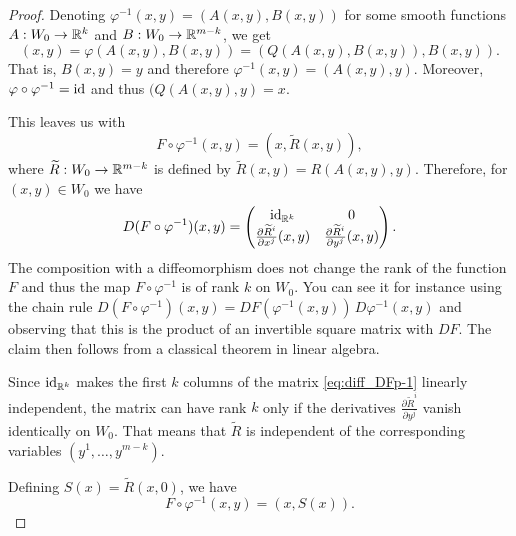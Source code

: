 \begin{proof}
  Denoting $\varphi^{-1}(x,y) = (A(x,y), B(x,y))$ for some smooth functions
  $A : W_0 \to \mathbb{R}^k$ and $B : W_0 \to \mathbb{R}^{m-k}$, we get
  \begin{equation}
    (x,y) = \varphi(A(x,y), B(x,y)) = (Q(A(x,y), B(x,y)), B(x,y)).
  \end{equation}
  That is, $B(x,y) = y$ and therefore $\varphi^{-1}(x,y) = (A(x,y), y)$.
  Moreover, $\varphi \circ \varphi^{-1} = \operatorname{id}$ and thus $(Q(A(x,y),y) = x$.

  This leaves us with
  \begin{equation}
    F\circ\varphi^{-1}(x,y) = (x, \widetilde{R}(x,y)),
  \end{equation}
  where $\widetilde{R} : W_0 \to\mathbb{R}^{m-k}$ is defined by $\widetilde{R}(x,y) = R(A(x,y), y)$.
  Therefore, for $(x,y)\in W_0$ we have
  \begin{equation}\label{eq:diff_DFp-1}
    D(F\circ\varphi^{-1})(x,y) = \begin{pmatrix}
      \operatorname{id}_{\mathbb{R}^k} & 0 \\
      \frac{\partial\widetilde{R}^i}{\partial x^j}(x,y) & \frac{\partial\widetilde{R}^i}{\partial y^j}(x,y)
    \end{pmatrix}.
  \end{equation}
  The composition with a diffeomorphism does not change the rank of the function $F$ and
  thus the map $F\circ\varphi^{-1}$ is of rank $k$ on $W_0$.
  You can see it for instance using the chain rule
  $D(F\circ\varphi^{-1})(x,y) = DF(\varphi^{-1}(x,y))\, D\varphi^{-1}(x,y)$ and
  observing that this is the product of an invertible square matrix with $DF$.
  The claim then follows from a classical theorem in linear algebra.

  Since $\operatorname{id}_{\mathbb{R}^k}$ makes the first $k$ columns of the matrix \eqref{eq:diff_DFp-1}
  linearly independent, the matrix can have rank $k$ only if the derivatives 
  $\frac{\partial \widetilde{R}^i}{\partial y^j}$ vanish identically on $W_0$.
  That means that $\widetilde{R}$ is independent of the corresponding variables
  $(y^1, \ldots, y^{m-k})$.
  
  Defining $S(x) = \widetilde{R}(x, 0)$, we have
  \begin{equation}
    F\circ\varphi^{-1}(x,y) = (x, S(x)).
  \end{equation}


\end{proof}

